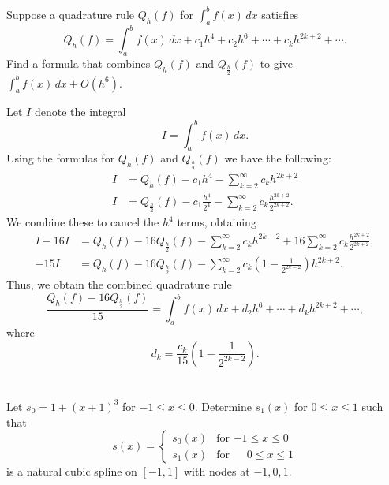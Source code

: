 \documentclass[12pt]{article}
\newenvironment{problem}
    {\begin{lrbox}{\mybox}\begin{minipage}{0.98\textwidth}}
    {\end{minipage}\end{lrbox}\framebox[\textwidth]{\usebox{\mybox}}}
\newcommand{\<}{\left\langle}
\renewcommand{\>}{\right\rangle}
\begin{document}
\newpage
\subsection{}
\begin{problem}
    Suppose a quadrature rule $Q_h(f)$ for $\int_a^b f(x) \,dx$ satisfies
    \[
        Q_h(f) = \int_a^b f(x) \,dx + c_1 h^4 + c_2 h^6 + \cdots + c_k h^{2k + 2} + \cdots.
    \]
    Find a formula that combines $Q_h(f)$ and $Q_{\frac{h}{2}}(f)$ to give $\int_a^b f(x) \,dx + O(h^6)$.
\end{problem}
\medskip

Let $I$ denote the integral
\[
    I = \int_a^b f(x) \,dx.
\]
Using the formulas for $Q_h(f)$ and $Q_{\frac{h}{2}}(f)$ we have the following:
\begin{align*}
    I &= Q_h(f) - c_1 h^4 - \sum_{k = 2}^\infty c_k h^{2k + 2} \\[1em]
    I &= Q_{\frac{h}{2}}(f) - c_1 \frac{h^4}{2^4}  - \sum_{k = 2}^\infty c_k\frac{h^{2k + 2}}{2^{2k + 2}}.
\end{align*}
We combine these to cancel the $h^4$ terms, obtaining
\begin{align*}
    I - 16I &= Q_h(f) - 16 Q_{\frac{h}{2}}(f) - \sum_{k = 2}^\infty c_k h^{2k + 2} + 16 \sum_{k = 2}^\infty c_k \frac{h^{2k + 2}}{2^{2k + 2}}, \\[1em]
    -15 I &= Q_h(f) - 16 Q_{\frac{h}{2}}(f) - \sum_{k = 2}^\infty c_k \left( 1 -  \frac1{2^{2k - 2}} \right) h^{2k + 2}.
\end{align*}
Thus, we obtain the combined quadrature rule
\[
    \frac{Q_h(f) - 16Q_{\frac{h}{2}}(f)}{15} = \int_a^b f(x) \,dx + d_2 h^6 + \cdots + d_k h^{2k + 2} + \cdots,
\]
where
\[
    d_k = \frac{c_k}{15} \left( 1 -  \frac1{2^{2k - 2}} \right).
\]

\newpage
\section{}
\begin{problem}
    Let $s_0 = 1 + (x + 1)^3$ for $-1 \leq x \leq 0$. Determine $s_1(x)$ for $0 \leq x \leq 1$ such that
    \[
        s(x) = \begin{cases}
            s_0(x) & \text{for $-1 \leq x \leq 0$} \\
            s_1(x) & \text{for $\phantom{-}0 \leq x \leq 1$}
        \end{cases}
    \]
    is a natural cubic spline on $[-1, 1]$ with nodes at $-1, 0, 1$.
\end{problem}
\medskip
\end{document}
